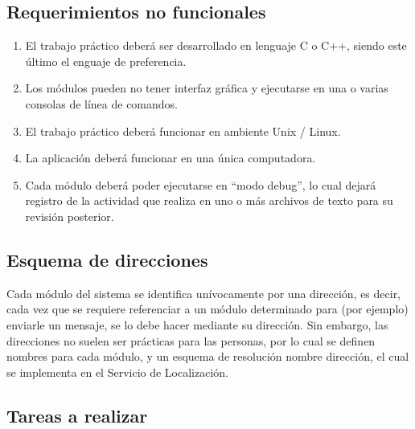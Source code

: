 \subsection*{Requerimientos no funcionales}
\begin{enumerate}
  \item El trabajo práctico deberá ser desarrollado en lenguaje C o C++, siendo este último el enguaje de preferencia.
  \item Los módulos pueden no tener interfaz gráfica y ejecutarse en una o varias consolas de línea de comandos.
  \item El trabajo práctico deberá funcionar en ambiente Unix / Linux.
  \item La aplicación deberá funcionar en una única computadora.
  \item Cada módulo deberá poder ejecutarse en “modo debug”, lo cual dejará registro de la actividad que realiza en uno o más archivos de texto para su revisión posterior.
\end{enumerate}

\subsection*{Esquema de direcciones}

Cada módulo del sistema se identifica unívocamente por una dirección, es decir, cada vez que se 
requiere referenciar a un módulo determinado para (por ejemplo) enviarle un mensaje, se lo debe 
hacer mediante su dirección.  Sin embargo, las direcciones no suelen ser prácticas para las personas, 
por lo cual se definen nombres para cada módulo, y un esquema de resolución nombre dirección,
el cual se implementa en el Servicio de Localización.

\subsection*{Tareas a realizar}

